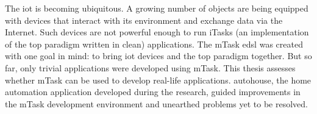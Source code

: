 The \acl{iot} is becoming ubiquitous. A growing number of objects are being equipped with devices that interact with its environment and exchange data via the Internet. Such devices are not powerful enough to run \gls{iTasks} (an implementation of the \acl{top} paradigm written in \gls{clean}) applications. The \gls{mTask} \acl{edsl} was created with one goal in mind: to bring \acl{iot} devices and the \acl{top} paradigm together. But so far, only trivial applications were developed using \gls{mTask}. This thesis assesses whether \gls{mTask} can be used to develop real-life applications. \gls{autohouse}, 
the home automation application developed during the research, guided improvements in the \gls{mTask} development environment and unearthed problems yet to be resolved.